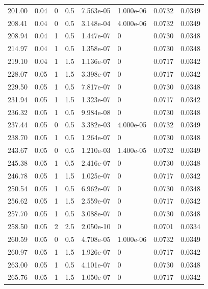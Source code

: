 \documentclass[preview]{standalone}
\begin{document}
{{{\begin{tabular}{L{1.2cm}C{1.2cm} C{0.3cm}C{0.5cm} C{1.4cm}C{1.4cm} C{1.4cm}C{1.4cm}}
  201.00  &  0.04  & 0     & 0.5 &  7.563e-05  & 1.000e-06  & 0.0732 &  0.0349   \\ 
  208.41  &  0.04  & 0     & 0.5 &  3.148e-04  & 4.000e-06  & 0.0732 &  0.0349   \\ 
  208.94  &  0.04  & 1     & 0.5 &  1.447e-07  & 0  & 0.0730 &  0.0348   \\ 
  214.97  &  0.04  & 1     & 0.5 &  1.358e-07  & 0  & 0.0730 &  0.0348   \\ 
  219.10  &  0.04  & 1     & 1.5 &  1.136e-07  & 0  & 0.0717 &  0.0342   \\ 
  228.07  &  0.05  & 1     & 1.5 &  3.398e-07  & 0  & 0.0717 &  0.0342   \\ 
  229.50  &  0.05  & 1     & 0.5 &  7.817e-07  & 0  & 0.0730 &  0.0348   \\ 
  231.94  &  0.05  & 1     & 1.5 &  1.323e-07  & 0  & 0.0717 &  0.0342   \\ 
  236.32  &  0.05  & 1     & 0.5 &  9.984e-08  & 0  & 0.0730 &  0.0348   \\ 
  237.44  &  0.05  & 0     & 0.5 &  3.382e-03  & 4.000e-05  & 0.0732 &  0.0349   \\ 
  238.70  &  0.05  & 1     & 0.5 &  1.264e-07  & 0  & 0.0730 &  0.0348   \\ 
  243.67  &  0.05  & 0     & 0.5 &  1.210e-03  & 1.400e-05  & 0.0732 &  0.0349   \\ 
  245.38  &  0.05  & 1     & 0.5 &  2.416e-07  & 0  & 0.0730 &  0.0348   \\ 
  246.78  &  0.05  & 1     & 1.5 &  1.025e-07  & 0  & 0.0717 &  0.0342   \\ 
  250.54  &  0.05  & 1     & 0.5 &  6.962e-07  & 0  & 0.0730 &  0.0348   \\ 
  256.62  &  0.05  & 1     & 1.5 &  2.559e-07  & 0  & 0.0717 &  0.0342   \\ 
  257.70  &  0.05  & 1     & 0.5 &  3.088e-07  & 0  & 0.0730 &  0.0348   \\ 
  258.50  &  0.05  & 2     & 2.5 &  2.050e-10  & 0  & 0.0701 &  0.0334   \\ 
  260.59  &  0.05  & 0     & 0.5 &  4.708e-05  & 1.000e-06  & 0.0732 &  0.0349   \\ 
  260.97  &  0.05  & 1     & 1.5 &  1.926e-07  & 0  & 0.0717 &  0.0342   \\ 
  263.00  &  0.05  & 1     & 0.5 &  4.101e-07  & 0  & 0.0730 &  0.0348   \\ 
  265.76  &  0.05  & 1     & 1.5 &  1.050e-07  & 0  & 0.0717 &  0.0342   \\ 

\end{tabular}}}}
\end{document}
